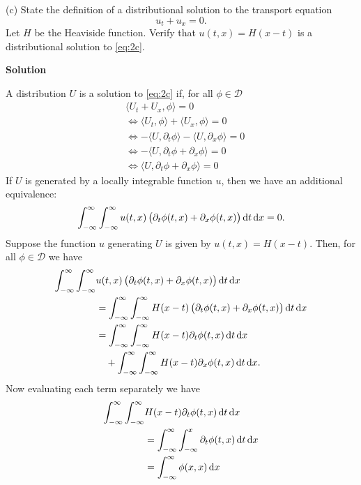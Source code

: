 \documentclass{article}
\begin{document}
\vspace{5mm}

(c) State the definition of a distributional solution to the transport
equation
%
\begin{equation}
    u_t + u_x = 0
    .
    \label{eq:2c}
\end{equation}
%
Let $H$ be the Heaviside function. Verify that $u(t, x) = H(x - t)$ is a
distributional solution to \eqref{eq:2c}.

\textbf{Solution}

A distribution $U$ is a solution to \eqref{eq:2c} if, for all
$\phi \in \mathcal{D}$
%
\begin{align*}
    &\langle U_t + U_x, \phi \rangle = 0 \\
    &\iff \langle U_t, \phi \rangle + \langle U_x, \phi \rangle = 0 \\
    &\iff - \langle U, \partial_t \phi \rangle - \langle U, \partial_x \phi \rangle = 0 \\
    &\iff - \langle U, \partial_t \phi  + \partial_x \phi \rangle = 0 \\
    &\iff \langle U, \partial_t \phi  + \partial_x \phi \rangle = 0
\end{align*}
%
If $U$ is generated by a locally integrable function $u$, then we have an
additional equivalence:
%
\begin{equation*}
    \int_{-\infty}^\infty \int_{-\infty}^\infty
        u(t, x) \del{\partial_t \phi(t, x) + \partial_x \phi(t, x)}
    \dif t \dif x
    = 0
    .
\end{equation*}
%
Suppose the function $u$ generating $U$ is given by
$u(t, x) = H(x - t)$. Then, for all $\phi \in \mathcal{D}$ we have
%
\begin{align*}
    \int_{-\infty}^\infty \int_{-\infty}^\infty&
        u(t, x) \del{\partial_t \phi(t, x) + \partial_x \phi(t, x)}
    \dif t \dif x \\
        &= \int_{-\infty}^\infty \int_{-\infty}^\infty
            H(x - t) \del{\partial_t \phi(t, x) + \partial_x \phi(t, x)}
           \dif t \dif x \\
        &= \int_{-\infty}^\infty \int_{-\infty}^\infty H(x - t) \partial_t \phi(t, x) \dif t \dif x \\
        &\quad + \int_{-\infty}^\infty \int_{-\infty}^\infty H(x - t) \partial_x \phi(t, x) \dif t \dif x
        .
\end{align*}
%
Now evaluating each term separately we have
%
\begin{align*}
    \int_{-\infty}^\infty \int_{-\infty}^\infty& H(x - t) \partial_t \phi(t, x) \dif t \dif x \\
        &= \int_{-\infty}^\infty \int_{-\infty}^x \partial_t \phi(t, x) \dif t \dif x \\
        &= \int_{-\infty}^\infty \phi(x, x) \dif x
\end{align*}
\end{document}
